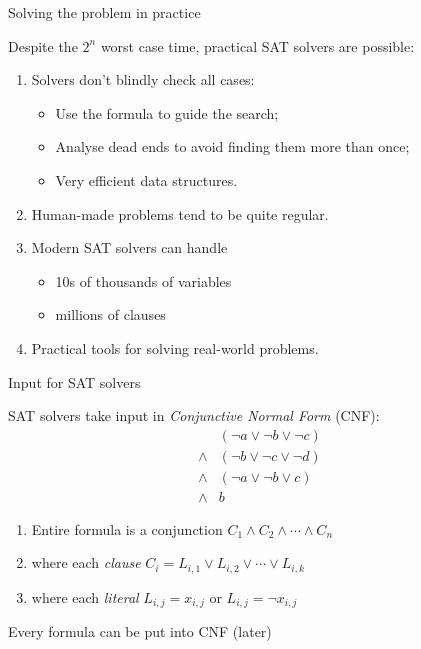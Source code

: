 \documentclass[xetex,aspectratio=169,14pt,hyperref={pdfpagelabels=true,pdflang={en-GB}}]{beamer}
\begin{document}
\begin{frame}
  {Solving the problem in practice}

  Despite the $2^n$ worst case time, practical SAT solvers are possible:
  \begin{enumerate}
  \item Solvers don't blindly check all cases:
    \begin{itemize}
    \item Use the formula to guide the search;
    \item Analyse dead ends to avoid finding them more than once;
    \item Very efficient data structures.
    \end{itemize}
  \item Human-made problems tend to be quite regular.
  \item Modern SAT solvers can handle
    \begin{itemize}
    \item 10s of thousands of variables
    \item millions of clauses
    \end{itemize}
  \item Practical tools for solving real-world problems.
  \end{enumerate}
\end{frame}

\begin{frame}
  {Input for SAT solvers}

  SAT solvers take input in \emph{Conjunctive Normal Form} (CNF):
  \begin{displaymath}
    \begin{array}{cl}
      &(\lnot a \lor \lnot b \lor \lnot c) \\
      \land&(\lnot b \lor \lnot c \lor \lnot d) \\
      \land&(\lnot a \lor \lnot b \lor c) \\
      \land&b
    \end{array}
  \end{displaymath}
  \begin{enumerate}
  \item Entire formula is a conjunction $C_1 \land C_2 \land \cdots \land C_n$
  \item where each \emph{clause} $C_i = L_{i,1} \lor L_{i,2} \lor \cdots \lor L_{i,k}$
  \item where each \emph{literal} $L_{i,j} = x_{i,j}$ or $L_{i,j} = \lnot x_{i,j}$
  \end{enumerate}

  \raggedleft
  {\footnotesize \textcolor{black!60}{Every formula can be put into CNF (later)}}

  \raggedright

\end{frame}
\end{document}
